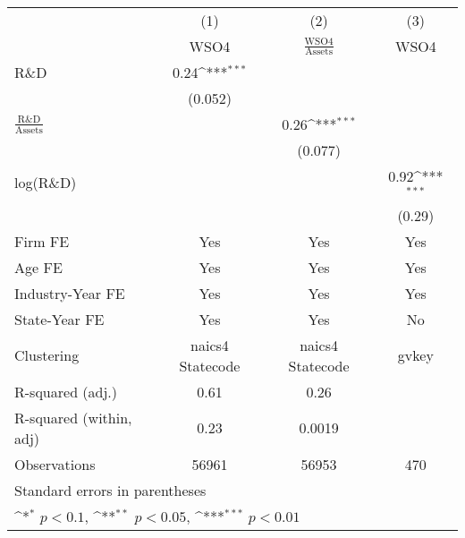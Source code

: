 {
\def\sym#1{\ifmmode^{#1}\else\(^{#1}\)\fi}
\begin{tabular}{l*{3}{c}}
\toprule
                    &\multicolumn{1}{c}{(1)}&\multicolumn{1}{c}{(2)}&\multicolumn{1}{c}{(3)}\\
                    &\multicolumn{1}{c}{WSO4}&\multicolumn{1}{c}{$\frac{\textrm{WSO4}}{\textrm{Assets}}$}&\multicolumn{1}{c}{WSO4}\\
\midrule
R\&D                &        0.24\sym{***}&                     &                     \\
                    &     (0.052)         &                     &                     \\
\addlinespace
$\frac{\textrm{R\&D}}{\textrm{Assets}}$&                     &        0.26\sym{***}&                     \\
                    &                     &     (0.077)         &                     \\
\addlinespace
log(R\&D)           &                     &                     &        0.92\sym{***}\\
                    &                     &                     &      (0.29)         \\
\addlinespace
Firm FE             &         Yes         &         Yes         &         Yes         \\
\addlinespace
Age FE              &         Yes         &         Yes         &         Yes         \\
\addlinespace
Industry-Year FE    &         Yes         &         Yes         &         Yes         \\
\addlinespace
State-Year FE       &         Yes         &         Yes         &          No         \\
\midrule
Clustering          &naics4 Statecode         &naics4 Statecode         &       gvkey         \\
R-squared (adj.)    &        0.61         &        0.26         &                     \\
R-squared (within, adj)&        0.23         &      0.0019         &                     \\
Observations        &       56961         &       56953         &         470         \\
\bottomrule
\multicolumn{4}{l}{\footnotesize Standard errors in parentheses}\\
\multicolumn{4}{l}{\footnotesize \sym{*} \(p<0.1\), \sym{**} \(p<0.05\), \sym{***} \(p<0.01\)}\\
\end{tabular}
}
